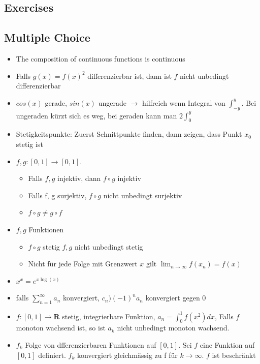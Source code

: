 \documentclass[8pt]{article}
\begin{document}
\begin{multicols*}{3}
\newpage

\section{Exercises}
\subsection{Multiple Choice}
\begin{itemize}
 \item The composition of continuous functions is continuous
 \item Falls $g(x) = f(x)^2$ differenzierbar ist, dann ist $f$ nicht unbedingt differenzierbar
 \item $cos(x)$ gerade, $sin(x)$ ungerade $\rightarrow$ hilfreich wenn Integral von $\int_{-y}^{y}$. Bei ungeraden kürzt sich es weg, bei geraden kann man $2\int_{0}^{y}$
 \item Stetigkeitspunkte: Zuerst Schnittpunkte finden, dann zeigen, dass Punkt $x_0$ stetig ist
 \item $f, g : [0, 1] \rightarrow [0, 1]$. 
\begin{itemize}
 \item Falls $f, g$ injektiv, dann $f \circ g$ injektiv
 \item Falls f, g surjektiv, $f \circ g$ nicht unbedingt surjektiv
 \item $f \circ g \neq g \circ f$
\end{itemize}
 \item $f, g$ Funktionen
\begin{itemize}
 \item $f \circ g$ stetig $f, g$ nicht unbedingt stetig
 \item Nicht für jede Folge mit Grenzwert $x$ gilt $\lim_{n \to  \infty} f(x_n) = f(x)$
\end{itemize}
 \item $x^x = e ^{x\log(x)}$
 \item falls $\sum_{n = 1}^{\infty} a_n$ konvergiert, $c_n ) (-1)^n a_n$ konvergiert gegen 0
 \item $f: [0, 1] \rightarrow \mathbf{R}$ stetig, integrierbare Funktion, $a_n = \int_{0}^{1} f(x^2) dx$, Falls $f$ monoton wachsend ist, so ist $a_k$ nicht unbedingt monoton wachsend.
 \item $f_k$ Folge von dfferenzierbaren Funktionen auf $[0, 1]$. Sei $f$ eine Funktion auf $[0, 1]$ definiert. $f_k$ konvergiert gleichmässig zu f für $k \rightarrow \infty$. $f$ ist beschränkt
\begin{itemize}

\end{itemize}
\end{itemize}
\end{multicols*}
\end{document}
